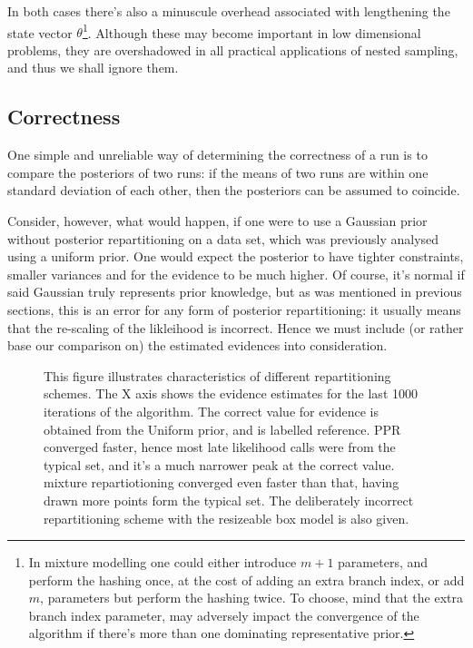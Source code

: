 \documentclass[usenatbib]{mnras}
\begin{document}
In both cases there's also a minuscule overhead associated with
lengthening the state vector \(\theta\)\footnote{In mixture modelling one could either introduce \(m+1\) parameters, and perform the hashing once, at the cost of adding an extra branch index, or add \(m\), parameters but perform the hashing twice. To choose, mind that the extra branch index parameter, may adversely impact the convergence of the algorithm if there's more than one dominating representative prior.}.
Although these may become important in low dimensional problems,
they are overshadowed in all practical applications of nested
sampling, and thus we shall ignore them.

\subsection{Correctness}
\label{sec:orge2fac0a}
One simple and unreliable way of determining the correctness of a
run is to compare the posteriors of two runs: if the means of two
runs are within one standard deviation of each other, then the
posteriors can be assumed to coincide.

Consider, however, what would happen, if one were to use a Gaussian
prior without posterior repartitioning on a data set, which was
previously analysed using a uniform prior. One would expect the
posterior to have tighter constraints, smaller variances and for
the evidence to be much higher. Of course, it's normal if said
Gaussian truly represents prior knowledge, but as was mentioned in
previous sections, this is an error for any form of posterior
repartitioning: it usually means that the re-scaling of the
likleihood is incorrect. Hence we must include (or rather base our
comparison on) the estimated evidences into consideration.

\begin{figure}

\caption{\label{org5302e5a}
This figure illustrates characteristics of different repartitioning schemes. The X axis shows the evidence estimates for the last 1000 iterations of the algorithm. The correct value for evidence is obtained from the Uniform prior, and is labelled reference. PPR converged faster, hence most late likelihood calls were from the typical set, and it's a much narrower peak at the correct value. mixture repartiotioning converged even faster than that, having drawn more points form the typical set. The deliberately incorrect repartitioning scheme with the resizeable box model is also given.}
\end{figure}
\end{document}
